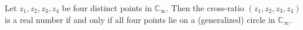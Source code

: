 Let $z_1, z_2, z_3, z_4$ be four distinct points in $\mathbb{C}_\infty$. Then the cross-ratio $(z_1, z_2, z_3, z_4)$ is a real number if and only if all four points lie on a (generalized) circle in $\mathbb{C}_\infty$.
